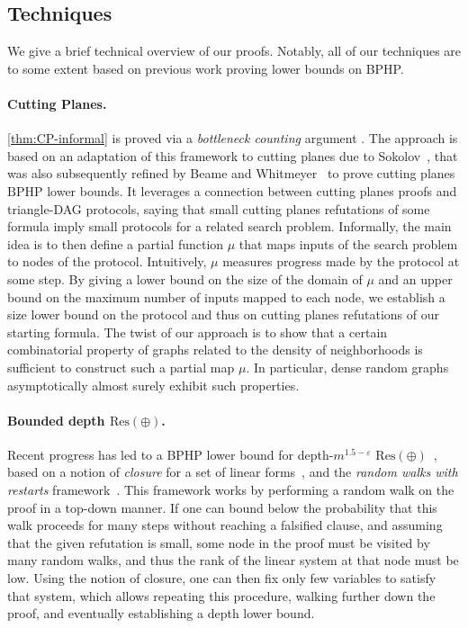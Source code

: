 \documentclass[10pt,a4paper]{article}
\theoremstyle{definition}
\theoremstyle{remark}
\theoremstyle{example}
\theoremstyle{plain}
\newcommand{\ResParity}{\mathrm{Res}(\oplus)}
\newcommand{\ResLin}{\textrm{Res}(\oplus)}
\newcommand{\myparagraph}[1]{\paragraph{#1}}
\begin{document}
\subsection{Techniques}
We give a brief technical overview of our proofs. Notably, all of our techniques are to some extent based on previous work proving lower bounds on BPHP. 

\myparagraph{Cutting Planes.}
\autoref{thm:CP-informal} is proved via a \emph{bottleneck counting} argument \cite{HAKEN1999326}. The approach is based on
an adaptation of this framework to cutting planes due to Sokolov~\cite{Sokolov24RandomCNFs}, that was also subsequently refined by Beame and Whitmeyer~\cite{BeameW2025multiparty} to prove cutting planes $\mathrm{BPHP}$ lower bounds. It leverages a connection between cutting planes proofs and triangle-DAG protocols, saying that small cutting planes refutations of some formula imply small protocols for a related search problem. Informally, the main idea is to then define a partial function $\mu$ that maps inputs of the search problem to nodes of the protocol. Intuitively, $\mu$ measures progress made by the protocol at some step. By giving a lower bound on the size of the domain of $\mu$ and an upper bound on the maximum number of inputs mapped to each node, we establish a size lower bound on the protocol and thus on cutting planes refutations of our starting formula. The twist of our approach is to show that a certain combinatorial property of graphs related to the density of neighborhoods is sufficient to construct such a partial map $\mu$. In particular, dense random graphs asymptotically almost surely exhibit such properties.

\myparagraph{Bounded depth $\ResParity$.}
Recent progress has led to a BPHP lower bound for depth-$m^{1.5-\varepsilon}$ $\ResLin$~\cite{BI25bphp}, 
based on a notion of \emph{closure} for a set of linear forms~\cite{EGI24regular}, and 
the \emph{random walks with restarts} framework~\cite{AI25lifting}.
This framework works by performing a random walk on the proof in a top-down manner. 
If one can bound below the probability that this walk proceeds for many steps without reaching a falsified clause, and assuming that the given refutation is small, some node in the proof must be visited by many random walks, and thus the rank of the linear system at that node must be low.
Using the notion of closure, one can then fix only few variables to satisfy that system, which allows repeating this procedure, walking further down the proof, and eventually establishing a depth lower bound. 
\end{document}
